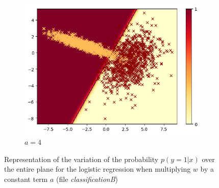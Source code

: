 \documentclass[a4paper, 11pt]{article}
\newcommand{\file}[1]{\emph{#1}}
\begin{document}
\begin{figure}[!ht]
\begin{subfigure}{.45\textwidth}
    \includegraphics[width=1\linewidth]{W_times_4.png}
    \caption{$a = 4$}
    \label{fig:W4}
  \end{subfigure}%
  \caption{Representation of the variation of the probability $p(y = 1 | x)$ over the entire plane for the logistic regression when multiplying $w$ by a constant term $a$ (file \file{classificationB})}
  \label{fig:W}
\end{figure}




\end{document}
